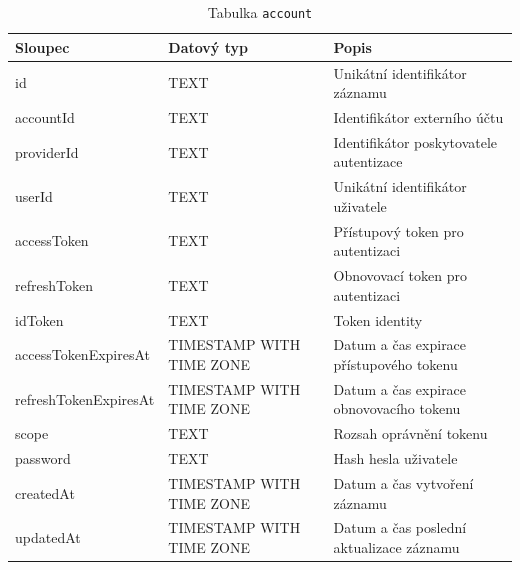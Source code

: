 \begin{table}[ht!]
    \centering
    \begin{tabularx}{\textwidth}{|l|l|L|}
        \hline
        \textbf{Sloupec}      & \textbf{Datový typ}      & \textbf{Popis}                           \\ \hline
        id                    & TEXT                     & Unikátní identifikátor záznamu           \\ \hline
        accountId             & TEXT                     & Identifikátor externího účtu             \\ \hline
        providerId            & TEXT                     & Identifikátor poskytovatele autentizace  \\ \hline
        userId                & TEXT                     & Unikátní identifikátor uživatele         \\ \hline
        accessToken           & TEXT                     & Přístupový token pro autentizaci         \\ \hline
        refreshToken          & TEXT                     & Obnovovací token pro autentizaci         \\ \hline
        idToken               & TEXT                     & Token identity                           \\ \hline
        accessTokenExpiresAt  & TIMESTAMP WITH TIME ZONE & Datum a čas expirace přístupového tokenu \\ \hline
        refreshTokenExpiresAt & TIMESTAMP WITH TIME ZONE & Datum a čas expirace obnovovacího tokenu \\ \hline
        scope                 & TEXT                     & Rozsah oprávnění tokenu                  \\ \hline
        password              & TEXT                     & Hash hesla uživatele                     \\ \hline
        createdAt             & TIMESTAMP WITH TIME ZONE & Datum a čas vytvoření záznamu            \\ \hline
        updatedAt             & TIMESTAMP WITH TIME ZONE & Datum a čas poslední aktualizace záznamu \\ \hline
    \end{tabularx}
    \caption{Tabulka \texttt{account}}
    \label{tab:account}
\end{table}
